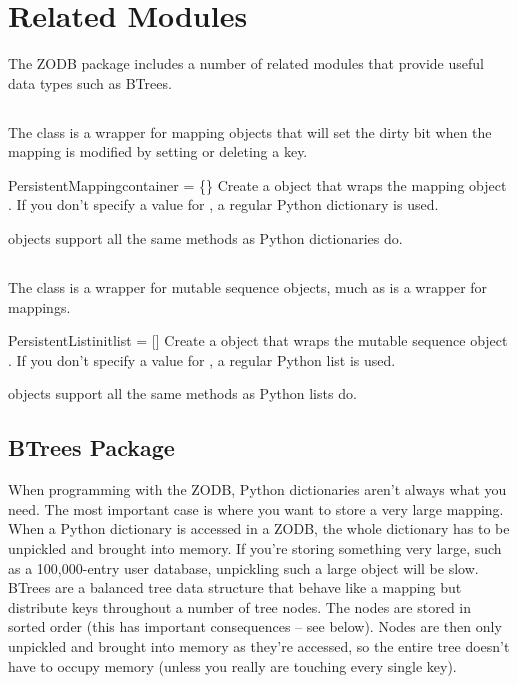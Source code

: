 

\section{Related Modules}

The ZODB package includes a number of related modules that provide
useful data types such as BTrees.

\subsection{}

The  class is a wrapper for mapping objects
that will set the dirty bit when the mapping is modified by setting or
deleting a key.

\begin{funcdesc}{PersistentMapping}{container = \{\}}
Create a  object that wraps the
mapping object .  If you don't specify a
value for , a regular Python dictionary is used.
\end{funcdesc}

 objects support all the same methods as
Python dictionaries do.

\subsection{}

The  class is a wrapper for mutable sequence objects,
much as  is a wrapper for mappings.

\begin{funcdesc}{PersistentList}{initlist = []}
Create a  object that wraps the
mutable sequence object .  If you don't specify a
value for , a regular Python list is used.
\end{funcdesc}

 objects support all the same methods as
Python lists do.


\subsection{BTrees Package}

When programming with the ZODB, Python dictionaries aren't always what
you need.  The most important case is where you want to store a very
large mapping.  When a Python dictionary is accessed in a ZODB, the
whole dictionary has to be unpickled and brought into memory.  If
you're storing something very large, such as a 100,000-entry user
database, unpickling such a large object will be slow.  BTrees are a
balanced tree data structure that behave like a mapping but distribute
keys throughout a number of tree nodes.  The nodes are stored in
sorted order (this has important consequences -- see below).  Nodes are
then only unpickled and brought into memory as they're accessed, so the
entire tree doesn't have to occupy memory (unless you really are
touching every single key).

